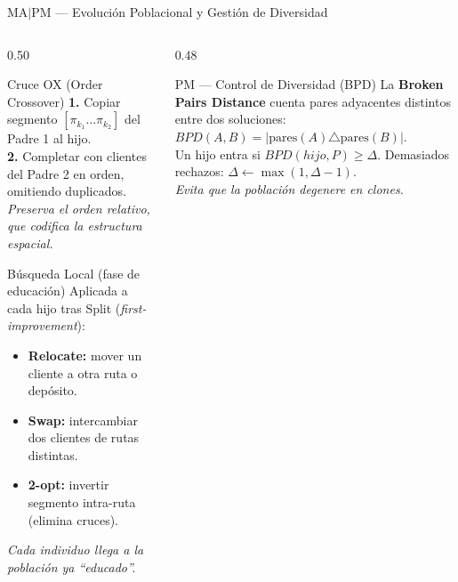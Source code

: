 \documentclass[aspectratio=169,10pt]{beamer}
\begin{document}
\begin{frame}{MA$|$PM --- Evolución Poblacional y Gestión de Diversidad}
  \begin{columns}[T,onlytextwidth]
    \begin{column}{0.50\textwidth}
      \begin{block}{Cruce OX (Order Crossover)}\footnotesize
        \textbf{1.} Copiar segmento $[\pi_{k_1}\ldots\pi_{k_2}]$ del Padre 1 al hijo.\\
        \textbf{2.} Completar con clientes del Padre 2 en orden, omitiendo duplicados.\\[0.1em]
        \textit{Preserva el orden relativo, que codifica la estructura espacial.}
      \end{block}
      \vspace{0.2em}
      \begin{block}{Búsqueda Local (fase de educación)}\footnotesize
        Aplicada a cada hijo tras Split (\textit{first-improvement}):
        \begin{itemize}\setlength{\itemsep}{0pt}
          \item \textbf{Relocate:} mover un cliente a otra ruta o depósito.
          \item \textbf{Swap:} intercambiar dos clientes de rutas distintas.
          \item \textbf{2-opt:} invertir segmento intra-ruta (elimina cruces).
        \end{itemize}
        \textit{Cada individuo llega a la población ya ``educado''.}
      \end{block}
    \end{column}
    \begin{column}{0.48\textwidth}
      \begin{block}{PM --- Control de Diversidad (BPD)}\footnotesize
        La \textbf{Broken Pairs Distance} cuenta pares adyacentes distintos
        entre dos soluciones:
        $BPD(A,B) = |\text{pares}(A) \triangle \text{pares}(B)|$.\\[0.1em]
        Un hijo entra si $BPD(hijo,P) \ge \Delta$.
        Demasiados rechazos: $\Delta \leftarrow \max(1,\Delta{-}1)$.\\[0.1em]
        \textit{Evita que la población degenere en clones.}
      \end{block}
      \vspace{0.2em}

\end{column}
\end{columns}
\end{frame}
\end{document}
